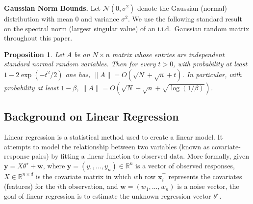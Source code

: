 \documentclass{article}
\theoremstyle{plain}
\newtheorem{proposition}[theorem]{Proposition}
\def \y {\mathbf y}
\def \NNN {\mathcal{N}}
\def \x {\mathbf x}
\def \w {\mathbf w}
\def \R {\mathbb{R}}
\begin{document}
\smallskip
\noindent\textbf{Gaussian Norm Bounds.} Let $\NNN(0,\sigma^2)$ denote the Gaussian (normal) distribution with mean $0$ and variance $\sigma^2$. We use the following standard result on the spectral norm (largest singular value) of an i.i.d.\ Gaussian random matrix throughout this paper.
\begin{proposition} \label{prop:GaussConc}
Let $A$ be an $N \times n$ matrix whose entries are independent standard normal random variables. Then for every $t > 0$, with probability at least $1 - 2 \exp(-t^2/2)$ one has, $\| A \|  = O(\sqrt{N}+ \sqrt{n} + t)$. In particular, with probability at least $1 - \beta $, $\| A \|  = O(\sqrt{N}+ \sqrt{n} + \sqrt{\log (1/\beta)})$.
\end{proposition}

\subsection{Background on Linear Regression} \label{app:linearregressionbackground}
Linear regression is a statistical method used to create a linear model. It attempts to model the relationship between two variables (known as covariate-response pairs) by fitting a linear function to observed data. More formally, given $\y = X \theta^\star+ \w$, where $\y = (y_1,\dots,y_n) \in \R^n$ is a vector of observed responses, $X\in \R^{n \times d}$ is the covariate matrix in which $i$th row $\x_i^\top$ represents the covariates (features) for the $i$th observation, and $\w = (w_1,\dots,w_n)$ is a noise vector, the goal of linear regression is to estimate the unknown regression vector $\theta^\star$.
\end{document}
